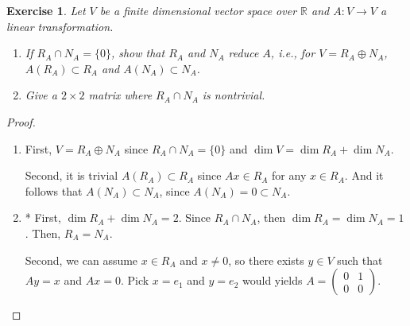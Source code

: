 \documentclass[11pt]{book}
\newtheorem{exercise}{Exercise}[section]
\theoremstyle{definition}
\numberwithin{equation}{subsection}
\begin{document}
\begin{exercise}
Let $V$ be a finite dimensional vector space over $\mathbb{R}$ and $A: V \to V$ a linear transformation.
\begin{enumerate}[label=(\alph*)]
    \item If $R_A \cap N_A = \{0\}$, show that $R_A$ and $N_A$ reduce $A$, i.e., for $V = R_A \oplus N_A$, $A(R_A) \subset R_A$ and $A(N_A) \subset N_A$.
    
    \item Give a $2 \times 2$ matrix where $R_A \cap N_A$ is nontrivial.
\end{enumerate}
\end{exercise}
\begin{proof}
~\begin{enumerate}[label=(\alph*)]
    \item First, $V = R_A \oplus N_A$ since $R_A \cap N_A = \{0\}$ and $\dim V = \dim R_A + \dim N_A$.
    
    Second, it is trivial $A(R_A) \subset R_A$ since $Ax \in R_A$ for any $x \in R_A$. And it follows that $A(N_A) \subset N_A$, since $A(N_A) = 0 \subset N_A$.
    
    \item* First, $\dim R_A + \dim N_A = 2$. Since $R_A \cap N_A$, then $\dim R_A = \dim N_A = 1$. Then, $R_A = N_A$.
    
    Second, we can assume $x \in R_A$ and $x \neq 0$, so there exists $y \in V$ such that $Ay = x$ and $Ax = 0$. Pick $x = e_1$ and $y = e_2$ would yields $A = \begin{pmatrix} 0 & 1 \\ 0 & 0 \end{pmatrix}$.
\end{enumerate}
\end{proof}

\medskip
\end{document}
